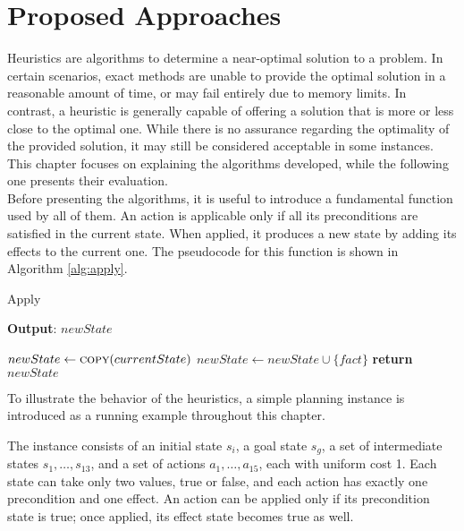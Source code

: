 \chapter{Proposed Approaches}
\label{ch:heuristics}
Heuristics are algorithms to determine a near-optimal solution to a problem. In certain scenarios,
exact methods are unable to provide the optimal solution in a reasonable amount of time, or may fail entirely
due to memory limits. In contrast, a heuristic is generally capable of offering a solution that is more or less close to
the optimal one.
While there is no assurance regarding the optimality of the provided solution, it may still be considered
acceptable in some instances.
This chapter focuses on explaining the algorithms developed, while the following one presents their evaluation.\\
Before presenting the algorithms, it is useful to introduce a fundamental function used by all of them.
An action is applicable only if all its preconditions are satisfied in the current state.
When applied, it produces a new state by adding its effects to the current one.
The pseudocode for this function is shown in Algorithm \ref{alg:apply}.

\begin{algorithm}
	\caption{Apply}
	\label{alg:apply}
	\hspace*{0.5em} \textbf{Output}: $newState$
	\begin{algorithmic}[1]
		\State $newState \gets \Call{copy}{currentState}$
		\State $newState \gets newState \cup \{fact\}$
		\EndIf
		\EndFor
		\State \textbf{return} $newState$
		\EndProcedure
	\end{algorithmic}
\end{algorithm}

To illustrate the behavior of the heuristics, a simple planning instance is introduced
as a running example throughout this chapter.

\begin{definition}
	The instance consists of an initial state $s_i$, a goal state $s_g$, a set of intermediate states $s_1, \dots, s_{13}$,
	and a set of actions $a_1, \dots, a_{15}$, each with uniform cost 1.
	Each state can take only two values, true or false, and each action has exactly one precondition and one effect.
	An action can be applied only if its precondition state is true; once applied, its effect state becomes true as well.
\end{definition}

